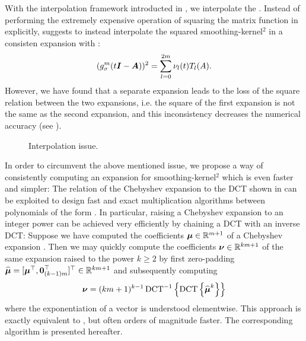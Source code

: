 With the interpolation framework introducted in ,
we interpolate the . Instead of performing the extremely
expensive operation of squaring the matrix function in 
explicitly, \cite{lin2017randomized} suggests to instead interpolate the
squared \gls{smoothing-kernel}$^2$ in a consisten expansion with
:
\begin{equation}
    (g_{\sigma}^m(t\boldsymbol{I} - \boldsymbol{A}))^2 = \sum_{l=0}^{2m} \nu_l(t) T_l(A).
    \label{equ:3-nystrom-ESS-chebyshev-expansion}
\end{equation}
However, we have found that a separate expansion leads to the loss of the
square relation between the two expansions, i.e. the square of the
first expansion is not the same as the second expansion, and this inconsistency
decreases the numerical accuracy (see ).\\
\begin{figure}[ht]
    \centering
    
    \caption{Interpolation issue.}
    \label{fig:3-nystrom-interpolation-issue}
\end{figure}

In order to circumvent the above mentioned issue, we propose a way of consistently computing
an expansion for \gls{smoothing-kernel}$^2$ which is even faster and simpler:
The relation of the Chebyshev expansion to the \gls{DCT} shown in 
can be exploited to design fast and exact multiplication algorithms between polynomials
of the form  \cite[proposition~3.1]{baszenski1997cosine}.
In particular, raising a Chebyshev expansion to an integer power can be achieved
very efficiently by chaining a \gls{DCT} with an inverse \gls{DCT}:
Suppose we have computed the coefficients $\boldsymbol{\mu} \in \mathbb{R}^{m+1}$
of a Chebyshev expansion .
Then we may quickly compute the coefficients $\boldsymbol{\nu} \in \mathbb{R}^{km+1}$
of the same expansion raised to the power $k \geq 2$ by first zero-padding
$\widehat{\boldsymbol{\mu}} = [\boldsymbol{\mu}^{\top}, \boldsymbol{0}_{(k-1)m}^{\top}]^{\top} \in \mathbb{R}^{km+1}$
and subsequently computing
\begin{equation}
    \boldsymbol{\nu} = (km + 1)^{k - 1} \operatorname{DCT}^{-1}\left\{ \operatorname{DCT}\left\{\widehat{\boldsymbol{\mu}}^{k}\right\} \right\}
    \label{equ:3-nystrom-chebyshev-potentiate-coefficients}
\end{equation}
where the exponentiation of a vector is understood elementwise.
This approach is exactly equivalent to \cite[algorithm~5]{lin2017randomized}, but
often orders of magnitude faster. The corresponding algorithm is presented hereafter.

